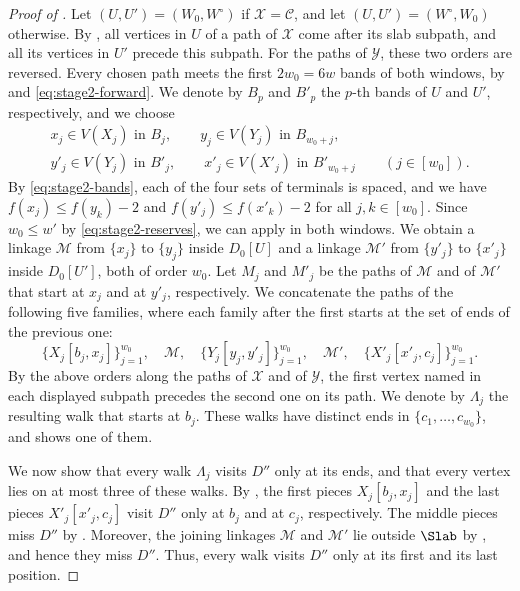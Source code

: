 \documentclass[fontsize=12pt,leading=14pt]{fullpaper}
\newcommand{\Ccal}{\mathcal{C}}
\newcommand{\Mcal}{\mathcal{M}}
\newcommand{\Xcal}{\mathcal{X}}
\newcommand{\Ycal}{\mathcal{Y}}
\begin{document}
\begin{proof}[Proof of ]
  Let $(U,U')=(W_0,W^\circ)$ if $\Xcal=\Ccal$, and let $(U,U')=(W^\circ,W_0)$ otherwise.
  By , all vertices in $U$ of a path of $\Xcal$ come after its slab subpath, and all its vertices in $U'$ precede this subpath.
  For the paths of $\Ycal$, these two orders are reversed.
  Every chosen path meets the first $2w_0=6w$ bands of both windows, by  and \eqref{eq:stage2-forward}.
  We denote by $B_p$ and $B'_p$ the $p$-th bands of $U$ and $U'$, respectively, and we choose
  \begin{gather*}
    x_j\in V(X_j)\text{ in }B_j,\qquad
    y_j\in V(Y_j)\text{ in }B_{w_0+j},\\
    y'_j\in V(Y_j)\text{ in }B'_j,\qquad
    x'_j\in V(X'_j)\text{ in }B'_{w_0+j}
    \qquad(j\in[w_0]).
  \end{gather*}
  By \eqref{eq:stage2-bands}, each of the four sets of terminals is spaced, and we have $f(x_j)\le f(y_k)-2$ and $f(y'_j)\le f(x'_k)-2$ for all $j,k\in[w_0]$.
  Since $w_0\le w'$ by \eqref{eq:stage2-reserves}, we can apply  in both windows.
  We obtain a linkage $\Mcal$ from $\{x_j\}$ to $\{y_j\}$ inside $D_0[U]$ and a linkage $\Mcal'$ from $\{y'_j\}$ to $\{x'_j\}$ inside $D_0[U']$, both of order $w_0$.
  Let $M_j$ and $M'_j$ be the paths of $\Mcal$ and of $\Mcal'$ that start at $x_j$ and at $y'_j$, respectively.
  We concatenate the paths of the following five families, where each family after the first starts at the set of ends of the previous one:
  \[
    \{X_j[b_j,x_j]\}_{j=1}^{w_0},\quad \Mcal,\quad
    \{Y_j[y_j,y'_j]\}_{j=1}^{w_0},\quad \Mcal',\quad
    \{X'_j[x'_j,c_j]\}_{j=1}^{w_0}.
  \]
  By the above orders along the paths of $\Xcal$ and of $\Ycal$, the first vertex named in each displayed subpath precedes the second one on its path.
  We denote by $\Lambda_j$ the resulting walk that starts at $b_j$.
  These walks have distinct ends in $\{c_1,\dots,c_{w_0}\}$, and  shows one of them.

  We now show that every walk $\Lambda_j$ visits $D''$ only at its ends, and that every vertex lies on at most three of these walks.
  By , the first pieces $X_j[b_j,x_j]$ and the last pieces $X'_j[x'_j,c_j]$ visit $D''$ only at $b_j$ and at $c_j$, respectively.
  The middle pieces miss $D''$ by .
  Moreover, the joining linkages $\Mcal$ and $\Mcal'$ lie outside $\Slab$ by , and hence they miss $D''$.
  Thus, every walk visits $D''$ only at its first and its last position.


\end{proof}
\end{document}
